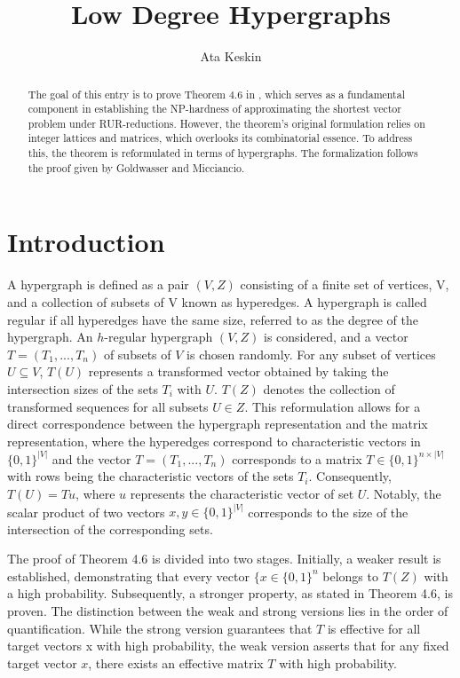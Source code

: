 \documentclass[11pt,a4paper]{article}
\begin{document}
\title{Low Degree Hypergraphs}
\author{Ata Keskin}
\maketitle

\begin{abstract}
The goal of this entry is to prove Theorem 4.6 in \cite{micciancio_complexity_2002}, which serves as a fundamental component in establishing the NP-hardness of approximating the shortest vector problem under RUR-reductions. However, the theorem's original formulation relies on integer lattices and matrices, which overlooks its combinatorial essence. To address this, the theorem is reformulated in terms of hypergraphs. The formalization follows the proof given by Goldwasser and Micciancio.
\end{abstract}

\tableofcontents

\section{Introduction}

A hypergraph is defined as a pair $(V, Z)$ consisting of a finite set of vertices, V, and a collection of subsets of V known as hyperedges. A hypergraph is called regular if all hyperedges have the same size, referred to as the degree of the hypergraph. An $h$-regular hypergraph $(V, Z)$ is considered, and a vector $T = (T_1, ..., T_n)$ of subsets of $V$ is chosen randomly. For any subset of vertices $U \subseteq V$, $T(U)$ represents a transformed vector obtained by taking the intersection sizes of the sets $T_i$ with $U$. $T(Z)$ denotes the collection of transformed sequences for all subsets $U \in Z$. This reformulation allows for a direct correspondence between the hypergraph representation and the matrix representation, where the hyperedges correspond to characteristic vectors in $\{0, 1\}^{\lvert V\rvert}$ and the vector $T = (T_1, ..., T_n)$ corresponds to a matrix $T \in \{0, 1\}^{n \times \lvert V\rvert}$ with rows being the characteristic vectors of the sets $T_i$. Consequently, $T(U) = Tu$, where $u$ represents the characteristic vector of set $U$. Notably, the scalar product of two vectors $x, y \in \{0, 1\}^{\lvert V\rvert}$ corresponds to the size of the intersection of the corresponding sets.

The proof of Theorem 4.6 is divided into two stages. Initially, a weaker result is established, demonstrating that every vector $\{x \in \{0, 1\}^n$ belongs to $T(Z)$ with a high probability. Subsequently, a stronger property, as stated in Theorem 4.6, is proven. The distinction between the weak and strong versions lies in the order of quantification. While the strong version guarantees that $T$ is effective for all target vectors x with high probability, the weak version asserts that for any fixed target vector $x$, there exists an effective matrix $T$ with high probability.
\end{document}

